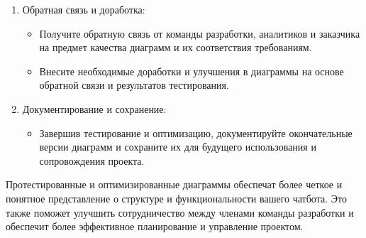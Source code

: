 \documentclass[letterpaper,10pt,russian]{sphinxmanual}
\begin{document}
\begin{enumerate}
\begin{itemize}
\end{itemize}

\item {} 
\sphinxAtStartPar
Обратная связь и доработка:
\begin{itemize}
\item {} 
\sphinxAtStartPar
Получите обратную связь от команды разработки, аналитиков и заказчика на предмет качества диаграмм и их соответствия требованиям.

\item {} 
\sphinxAtStartPar
Внесите необходимые доработки и улучшения в диаграммы на основе обратной связи и результатов тестирования.

\end{itemize}

\item {} 
\sphinxAtStartPar
Документирование и сохранение:
\begin{itemize}
\item {} 
\sphinxAtStartPar
Завершив тестирование и оптимизацию, документируйте окончательные версии диаграмм и сохраните их для будущего использования и сопровождения проекта.

\end{itemize}

\end{enumerate}

\sphinxAtStartPar
Протестированные и оптимизированные диаграммы обеспечат более четкое и понятное представление о структуре и функциональности вашего чат\sphinxhyphen{}бота. Это также поможет улучшить сотрудничество между членами команды разработки и обеспечит более эффективное планирование и управление проектом.
\end{document}
